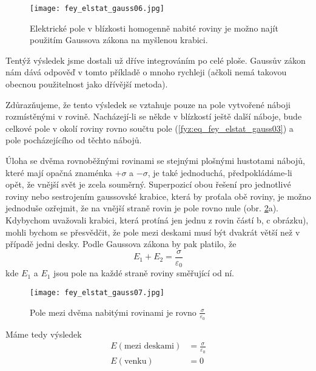       \begin{figure}[ht!] %
        \centering
        \texttt{[image: fey\_elstat\_gauss06.jpg]}
        \caption{Elektrické pole v blízkosti homogenně nabité roviny je možno najít použitím Gaussova zákona 
                 na myšlenou krabici.}
        \label{fyz:fig_fey_elstat_gauss06}
      \end{figure}
      
      Tentýž výsledek jsme dostali už dříve integrováním po celé ploše. Gaussův zákon nám dává odpověď v 
      tomto příkladě o mnoho rychleji (ačkoli nemá takovou obecnou použitelnost jako dřívější metoda).
      
      Zdůrazňujeme, že tento výsledek se vztahuje pouze na pole vytvořené náboji rozmístěnými v rovině. 
      Nacházejí-li se někde v blízkostí ještě další náboje, bude celkové pole v okolí roviny rovno součtu 
      pole (\ref{fyz:eq_fey_elstat_gauss03}) a pole pocházejícího od těchto nábojů.
      
      Úloha se dvěma rovnoběžnými rovinami se stejnými plošnými hustotami nábojů, které mají opačná znaménka 
      \(+\sigma\) a \(-\sigma\), je také jednoduchá, předpokládáme-li opět, že vnější svět je zcela souměrný. 
      Superpozicí obou řešení pro jednotlivé roviny nebo sestrojením gaussovské krabice, která by proťala obě 
      roviny, je možno jednoduše ozřejmit, že na vnější straně rovin je pole rovno nule (obr. 
      \ref{fyz:fig_fey_elstat_gauss07}a). Kdybychom uvažovali krabici, která protíná jen jednu z rovin částí 
      b, c obrázku), mohli bychom se přesvědčit, že pole mezi deskami musí být dvakrát větší než v případě 
      jedni desky. Podle Gaussova zákona by pak platilo, že
      \begin{equation}\label{fyz:eq_fey_elstat_gauss04}
        E_1 + E_2 = \frac{\sigma}{\varepsilon_0}
      \end{equation}
      kde \(E_1\) a \(E_1\) jsou pole na každé straně roviny směřující od ní.
      \begin{figure}[ht!] %
        \centering
        \texttt{[image: fey\_elstat\_gauss07.jpg]}
        \caption{Pole mezi dvěma nabitými rovinami je rovno \(\frac{\sigma}{\varepsilon_0}\)}
        \label{fyz:fig_fey_elstat_gauss07}
      \end{figure}
      Máme tedy výsledek
      \begin{align}
        E (\text{mezi deskami}) &= \frac{\sigma}{\varepsilon_0} \\
        E (\text{venku})        &= 0  
      \end{align}
      

